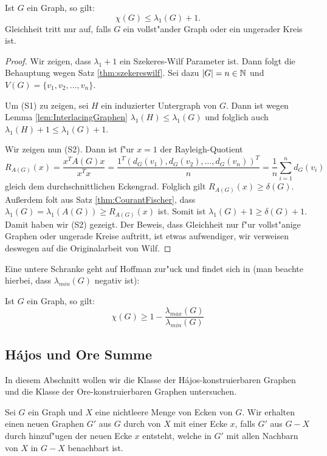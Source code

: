 \begin{theorem}
  Ist $G$ ein Graph, so gilt: 
  $$\chi(G) \leq \lambda_{1}(G) +1.$$
  Gleichheit tritt nur auf, falls $G$ ein vollst"ander Graph oder ein ungerader Kreis ist.
  \label{thm:wilfev}
\end{theorem}

\begin{proof}
  Wir zeigen, dass $\lambda_{1}+1$ ein Szekeres-Wilf Parameter ist. Dann folgt die Behauptung wegen Satz \ref{thm:szekereswilf}. Sei dazu $|G| = n \in {\mathbb{N}}$ und $V(G)= \{v_1,v_2, \dots , v_n \}$. 

  Um (S1) zu zeigen, sei $H$ ein induzierter Untergraph von $G$. Dann ist wegen Lemma \ref{lem:InterlacingGraphen} $\lambda_{1}(H) \leq \lambda_{1}(G)$ und folglich auch $\lambda_{1}(H) +1 \leq \lambda_{1}(G) +1$.

  Wir zeigen nun (S2). Dann ist f"ur $x=1$ der Rayleigh-Quotient $$R_{A(G)}(x) = \frac{x^{T}A(G)x}{x^{T}x} = \frac{1^{T}(d_G(v_1),d_G(v_2),\dots, d_G(v_n))^{T}}{n} = \frac{1}{n} \sum\limits_{i=1}^{n} d_G(v_i)$$ gleich dem durchschnittlichen Eckengrad. Folglich gilt $R_{A(G)}(x) \geq \delta(G)$. Au{\ss}erdem folt aus Satz \ref{thm:CourantFischer}, dass $\lambda_{1}(G) = \lambda_{1}(A(G)) \geq R_{A(G)}(x)$ ist. Somit ist
  $\lambda_{1}(G) +1 \geq \delta(G) +1$. Damit haben wir (S2) gezeigt. 
  Der Beweis, dass Gleichheit nur f"ur vollst"anige Graphen oder ungerade Kreise auftritt, ist etwas aufwendiger, wir verweisen deswegen auf die Originalarbeit \cite{Wilf67} von Wilf.
\end{proof}

Eine untere Schranke geht auf Hoffman zur"uck und findet sich in \cite{Hoffman70}(man beachte hierbei, dass $\lambda_{min}(G)$ negativ ist):
\begin{theorem}
  Ist $G$ ein Graph, so gilt:
  $$\chi(G) \geq 1 - \frac{\lambda_{max}(G)}{\lambda_{min}(G)}$$
  \label{thm:Hoffmanev}
\end{theorem}

\subsection{H\'ajos und Ore Summe}
In diesem Abschnitt wollen wir die Klasse der H\'ajos-konstruierbaren Graphen und die Klasse der Ore-konstruierbaren Graphen untersuchen. 

Sei $G$ ein Graph und $X$ eine nichtleere Menge von Ecken von $G$. Wir erhalten einen neuen Graphen $G'$ aus $G$ durch   von $X$ mit einer Ecke $x$, falls $G'$ aus $G-X$ durch hinzuf"ugen der neuen Ecke $x$ entsteht, welche in $G'$ mit allen Nachbarn von $X$ in $G-X$ benachbart ist. 

